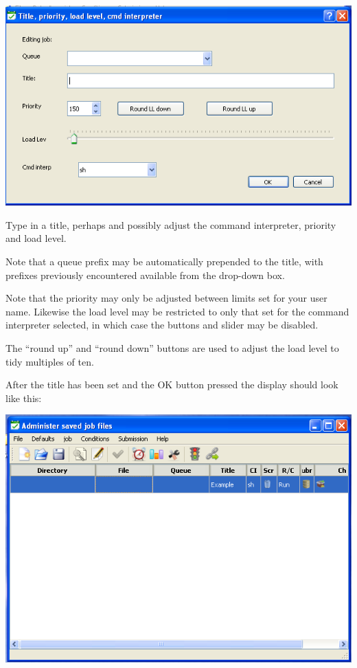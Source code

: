 \includegraphics{img/btrwnewjob2.png}

Type in a title, perhaps  and possibly adjust the command interpreter, priority and load level.

Note that a queue prefix may be automatically prepended to the title, with prefixes previously encountered available from
the drop-down box.

Note that the priority may only be adjusted between limits set for your user name. Likewise the load level may be restricted
to only that set for the command interpreter selected, in which case the buttons and slider may be disabled.

The ``round up'' and ``round down'' buttons are used to adjust the load level to tidy multiples of ten.

After the title has been set and the OK button pressed the display should look like this:

\includegraphics{img/btrwnewjob3.png}

